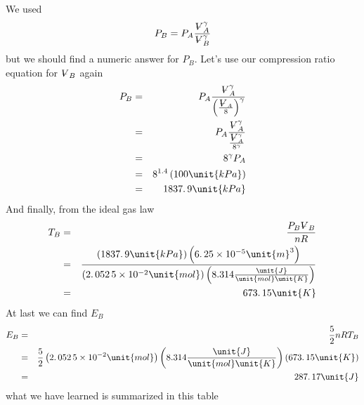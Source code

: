 \documentclass{article}
\begin{document}
We used 
\[
P_{B}=P_{A}\frac{%
\ooalign{\hfil$V$\hfil\cr\kern0.1em--\hfil\cr}%
_{A}^{\gamma }}{%
\ooalign{\hfil$V$\hfil\cr\kern0.1em--\hfil\cr}%
_{B}^{\gamma }} 
\]%
but we should find a numeric answer for $P_{B}.$ Let's use our compression
ratio equation for $%
\ooalign{\hfil$V$\hfil\cr\kern0.1em--\hfil\cr}%
_{B}$ again 
\begin{eqnarray*}
P_{B} &=&P_{A}\frac{%
\ooalign{\hfil$V$\hfil\cr\kern0.1em--\hfil\cr}%
_{A}^{\gamma }}{\left( \frac{%
\ooalign{\hfil$V$\hfil\cr\kern0.1em--\hfil\cr}%
_{A}}{8}\right) ^{\gamma }} \\
&=&P_{A}\frac{%
\ooalign{\hfil$V$\hfil\cr\kern0.1em--\hfil\cr}%
_{A}^{\gamma }}{\frac{%
\ooalign{\hfil$V$\hfil\cr\kern0.1em--\hfil\cr}%
_{A}^{\gamma }}{8^{\gamma }}} \\
&=&8^{\gamma }P_{A} \\
&=&8^{1.4}\left( 100\unit{kPa}\right) \\
&=&\allowbreak 1837.\,\allowbreak 9\unit{kPa}
\end{eqnarray*}%
And finally, from the ideal gas law 
\begin{eqnarray*}
T_{B} &=&\frac{P_{B}%
\ooalign{\hfil$V$\hfil\cr\kern0.1em--\hfil\cr}%
_{B}}{nR} \\
&=&\frac{\left( 1837.\,\allowbreak 9\unit{kPa}\right) \left( 6.\,25\times
10^{-5}\unit{m}^{3}\right) }{\left( 2.\,052\,5\times 10^{-2}\unit{mol}%
\right) \left( 8.314\frac{\unit{J}}{\unit{mol}\unit{K}}\right) } \\
&=&673.\,\allowbreak 15\unit{K}
\end{eqnarray*}%
At last we can find $E_{B}$%
\begin{eqnarray*}
E_{B} &=&\frac{5}{2}nRT_{B} \\
&=&\frac{5}{2}\left( \allowbreak 2.\,\allowbreak 052\,5\times 10^{-2}\unit{%
mol}\right) \left( 8.314\frac{\unit{J}}{\unit{mol}\unit{K}}\right) \left(
673.\,\allowbreak 15\unit{K}\right) \\
&=&\allowbreak 287.\,\allowbreak 17\unit{J}
\end{eqnarray*}%
what we have learned is summarized in this table
\end{document}
